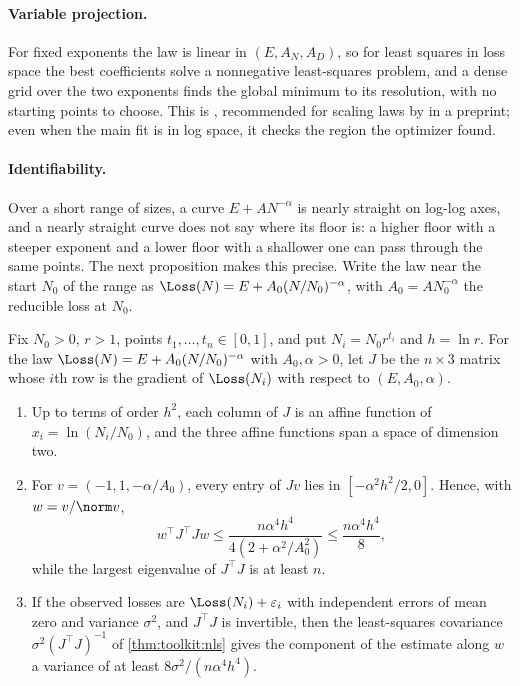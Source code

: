 \begin{refsection}
\paragraph{Variable projection.} For fixed exponents the law is linear in $(E,A_N,A_D)$, so for least squares in loss space the best coefficients solve a nonnegative least-squares problem, and a dense grid over the two exponents finds the global minimum to its resolution, with no starting points to choose. This is  \parencite{GolubPereyra1973}, recommended for scaling laws by \textcite{CzechEtAl2026} in a preprint; even when the main fit is in log space, it checks the region the optimizer found.

\paragraph{Identifiability.} Over a short range of sizes, a curve $E+AN^{-\alpha}$ is nearly straight on log-log axes, and a nearly straight curve does not say where its floor is: a higher floor with a steeper exponent and a lower floor with a shallower one can pass through the same points. The next proposition makes this precise. Write the law near the start $N_0$ of the range as $\Loss(N)=E+A_0(N/N_0)^{-\alpha}$, with $A_0=AN_0^{-\alpha}$ the reducible loss at $N_0$.

\begin{proposition}\label{prop:fitting:short}
Fix $N_0>0$, $r>1$, points $t_1,\dots,t_n\in[0,1]$, and put $N_i=N_0r^{t_i}$ and $h=\ln r$. For the law $\Loss(N)=E+A_0(N/N_0)^{-\alpha}$ with $A_0,\alpha>0$, let $J$ be the $n\times3$ matrix whose $i$th row is the gradient of $\Loss(N_i)$ with respect to $(E,A_0,\alpha)$.
\begin{enumerate}
\item Up to terms of order $h^2$, each column of $J$ is an affine function of $x_i=\ln(N_i/N_0)$, and the three affine functions span a space of dimension two.
\item For $v=(-1,1,-\alpha/A_0)$, every entry of $Jv$ lies in $[-\alpha^2h^2/2,0]$. Hence, with $w=v/\norm v$,
\[
w^\top J^\top Jw\le\frac{n\alpha^4h^4}{4(2+\alpha^2/A_0^2)}\le\frac{n\alpha^4h^4}8,
\]
while the largest eigenvalue of $J^\top J$ is at least $n$.
\item If the observed losses are $\Loss(N_i)+\varepsilon_i$ with independent errors of mean zero and variance $\sigma^2$, and $J^\top J$ is invertible, then the least-squares covariance $\sigma^2(J^\top J)^{-1}$ of \cref{thm:toolkit:nls} gives the component of the estimate along $w$ a variance of at least $8\sigma^2/(n\alpha^4h^4)$.
\end{enumerate}
\end{proposition}


\end{refsection}

